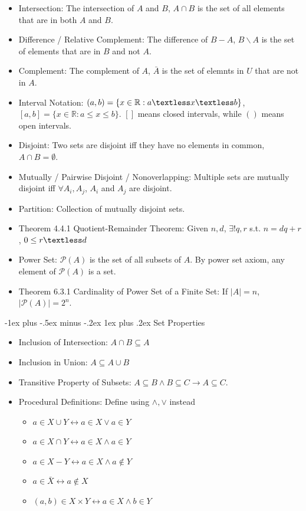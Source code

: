 \documentclass[10pt, portrait]{article}
\makeatletter
\renewcommand{\subsection}{\@startsection{subsection}{3}{0mm}%
                                {-1ex plus -.5ex minus -.2ex}%
                                {1ex plus .2ex}%
                                {\normalfont\small\bfseries}}%
\makeatother
\begin{document}
\begin{multicols*}{2}
\begin{itemize}
    \item Intersection: The intersection of $A$ and $B$, $A \cap B$ is the set of all elements that are in both $A$ and $B$.
    \item Difference / Relative Complement: The difference of $B - A$, $B \backslash A$ is the set of elements that are in $B$ and not $A$.
    \item Complement: The complement of $A$, $\bar{A}$ is the set of elemnts in $U$ that are not in $A$.
    \item Interval Notation: $(a, b) = \{x \in \mathbb{R} : a \textless x \textless b\}$, $[a, b] = \{x \in \mathbb{R} : a \leq x \leq b\}$. $[]$ means closed intervals, while $()$ means open intervals.
    \item Disjoint: Two sets are disjoint iff they have no elements in common, $A \cap B = \emptyset$.
    \item Mutually / Pairwise Disjoint / Nonoverlapping: Multiple sets are mutually disjoint iff $\forall A_i, A_j$, $A_i$ and $A_j$ are disjoint.
    \item Partition: Collection of mutually disjoint sets.
    \item Theorem 4.4.1 Quotient-Remainder Theorem: Given $n, d$, $\exists ! q, r$ s.t. $n = dq+r$, $0 \leq r \textless d$
    \item Power Set: $\mathcal{P}(A)$ is the set of all subsets of $A$. By power set axiom, any element of $\mathcal{P}(A)$ is a set.
    \item Theorem 6.3.1 Cardinality of Power Set of a Finite Set: If $\mid A \mid = n$, $\mid \mathcal{P}(A) \mid = 2^n$.
\end{itemize}

\subsection{Set Properties}
\begin{itemize}
    \item Inclusion of Intersection: $A \cap B \subseteq A$
    \item Inclusion in Union: $A \subseteq A \cup B$
    \item Transitive Property of Subsets: $A \subseteq B \land B \subseteq C \rightarrow A \subseteq C$.
    \item Procedural Definitions: Define using $\land, \lor$ instead
    \begin{itemize}
        \item $a \in X \cup Y \leftrightarrow a \in X \lor a \in Y$
        \item $a \in X \cap Y \leftrightarrow a \in X \land a \in Y$
        \item $a \in X - Y \leftrightarrow a \in X \land a \notin Y$
        \item $a \in \bar{X} \leftrightarrow a \notin X$
        \item $(a, b) \in X \times Y \leftrightarrow a \in X \land b \in Y$
    \end{itemize}
\end{itemize}


\end{multicols*}
\end{document}
